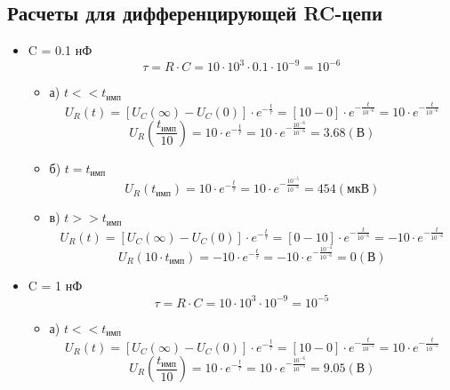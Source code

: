 \subsection{Расчеты для дифференцирующей RC-цепи}
\begin{itemize}
\item C = 0.1 нФ\\
\begin{equation}
		\tau = R \cdot C = 10 \cdot 10^3 \cdot 0.1 \cdot 10^{-9} = 10^{-6}
	\end{equation}
\begin{itemize}
\item[] а) $t << t_\text{имп}$\\
	\begin{equation}
		U_R(t) = [U_C(\infty) - U_C(0)] \cdot e^{-\frac{t}{\tau}} = [10 - 0] \cdot e^{-\frac{t}{10^{-6}}} = 10 \cdot e^{-\frac{t}{10^{-6}}}
	\end{equation}
	\begin{equation}
		U_R(\frac{t_\text{имп}}{10}) = 10 \cdot e^{-\frac{t}{\tau}} = 10 \cdot e^{-\frac{10^{-6}}{10^{-6}}} = 3.68 (\text{В})
	\end{equation}

\item[] б) $t = t_\text{имп}$\\
	\begin{equation}
		U_R(t_\text{имп}) = 10 \cdot e^{-\frac{t}{\tau}} = 10 \cdot e^{-\frac{10^{-5}}{10^{-6}}} = 454 (\text{мкВ})
	\end{equation}
	
\item[] в) $t >> t_\text{имп}$\\
	\begin{equation}
		U_R(t) = [U_C(\infty) - U_C(0)] \cdot e^{-\frac{t}{\tau}} = [0 - 10] \cdot e^{-\frac{t}{10^{-6}}} = -10 \cdot e^{-\frac{t}{10^{-6}}}
	\end{equation}
	\begin{equation}
		U_R(10 \cdot t_\text{имп}) = -10 \cdot e^{-\frac{t}{\tau}} = -10 \cdot e^{-\frac{10^{-4}}{10^{-6}}} = 0 (\text{В})
	\end{equation}
\end{itemize}

\item C = 1 нФ\\
\begin{equation}
		\tau = R \cdot C = 10 \cdot 10^3 \cdot 10^{-9} = 10^{-5}
	\end{equation}
\begin{itemize}
\item[] а) $t << t_\text{имп}$\\
	\begin{equation}
		U_R(t) = [U_C(\infty) - U_C(0)] \cdot e^{-\frac{t}{\tau}} = [10 - 0] \cdot e^{-\frac{t}{10^{-5}}} = 10 \cdot e^{-\frac{t}{10^{-5}}}
	\end{equation}
	\begin{equation}
		U_R(\frac{t_\text{имп}}{10}) = 10 \cdot e^{-\frac{t}{\tau}} = 10 \cdot e^{-\frac{10^{-6}}{10^{-5}}} = 9.05 (\text{В})
	\end{equation}


\end{itemize}
\end{itemize}
